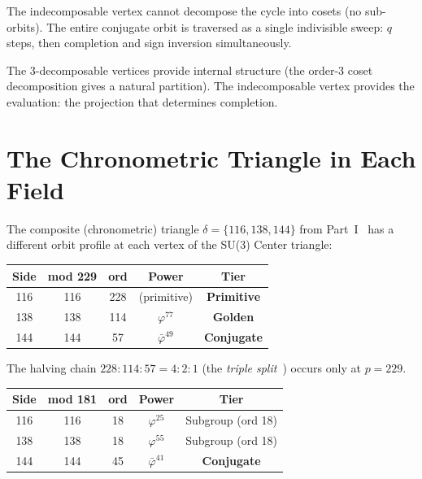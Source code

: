 The indecomposable vertex cannot decompose the cycle into cosets
(no sub-orbits). The entire conjugate orbit is traversed as a single
indivisible sweep: $q$ steps, then completion and sign inversion
simultaneously.

The 3-decomposable vertices provide internal structure (the
order-3 coset decomposition gives a natural partition). The
indecomposable vertex provides the evaluation: the projection
that determines completion.

\section{The Chronometric Triangle in Each Field}
\label{sec:chrono}

The composite (chronometric) triangle $\delta = \{116, 138, 144\}$
from Part~I~\cite{dwm_fst} has a different orbit profile at each
vertex of the SU(3) Center triangle:

\begin{center}
\begin{tabular}{@{}ccccc@{}}
\toprule
Side & mod 229 & ord & Power & Tier \\
\midrule
116 & 116 & 228 & (primitive) & \textbf{Primitive} \\
138 & 138 & 114 & $\varphi^{77}$ & \textbf{Golden} \\
144 & 144 &  57 & $\bar\varphi^{49}$ & \textbf{Conjugate} \\
\bottomrule
\end{tabular}
\end{center}

The halving chain $228 : 114 : 57 = 4 : 2 : 1$ (the
\emph{triple split}~\cite{dwm_fst})
occurs only at $p = 229$.

\begin{center}
\begin{tabular}{@{}ccccc@{}}
\toprule
Side & mod 181 & ord & Power & Tier \\
\midrule
116 & 116 & 18 & $\varphi^{25}$ & Subgroup (ord 18) \\
138 & 138 & 18 & $\varphi^{55}$ & Subgroup (ord 18) \\
144 & 144 & 45 & $\bar\varphi^{41}$ & \textbf{Conjugate} \\
\bottomrule
\end{tabular}
\end{center}


